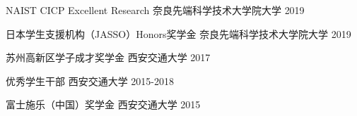 




\begin{cvhonors}





  \cvhonor
    {NAIST CICP Excellent Research} %
    {奈良先端科学技术大学院大学} 
    {}%
    {2019} %
    
  \cvhonor
    {日本学生支援机构（JASSO）Honors奖学金} %
    {奈良先端科学技术大学院大学} 
    {}%
    {2019} %
    
  \cvhonor
    {苏州高新区学子成才奖学金} %
    {西安交通大学} 
    {}%
    {2017} %
    
  \cvhonor
    {优秀学生干部} %
    {西安交通大学} 
    {}%
    {2015-2018} %
    
  \cvhonor
    {富士施乐（中国）奖学金} %
    {西安交通大学} 
    {}%
    {2015} %

    
    
    
\end{cvhonors}



